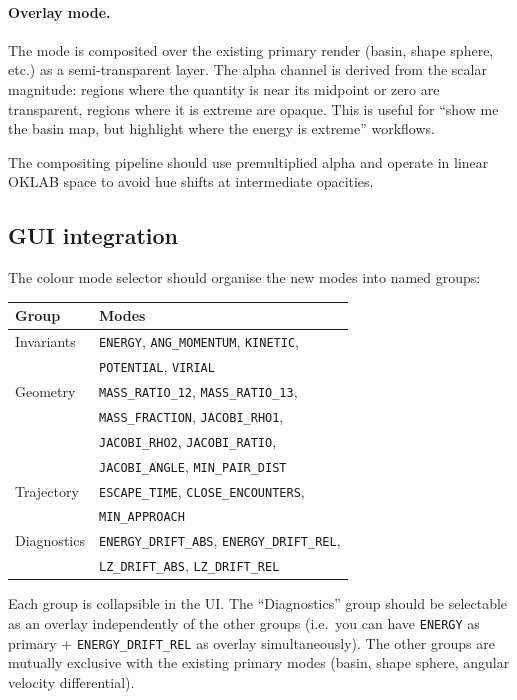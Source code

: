 \documentclass[11pt]{article}
\begin{document}
\paragraph{Overlay mode.} The mode is composited over the existing primary
render (basin, shape sphere, etc.) as a semi-transparent layer. The alpha
channel is derived from the scalar magnitude: regions where the quantity is
near its midpoint or zero are transparent, regions where it is extreme are
opaque. This is useful for ``show me the basin map, but highlight where the
energy is extreme'' workflows.

The compositing pipeline should use premultiplied alpha and operate in linear
OKLAB space to avoid hue shifts at intermediate opacities.

\subsection{GUI integration}

The colour mode selector should organise the new modes into named groups:

\begin{center}
\begin{tabular}{ll}
\toprule
Group & Modes \\
\midrule
Invariants & \texttt{ENERGY}, \texttt{ANG\_MOMENTUM}, \texttt{KINETIC}, \\
 & \texttt{POTENTIAL}, \texttt{VIRIAL} \\
Geometry & \texttt{MASS\_RATIO\_12}, \texttt{MASS\_RATIO\_13}, \\
 & \texttt{MASS\_FRACTION}, \texttt{JACOBI\_RHO1}, \\
 & \texttt{JACOBI\_RHO2}, \texttt{JACOBI\_RATIO}, \\
 & \texttt{JACOBI\_ANGLE}, \texttt{MIN\_PAIR\_DIST} \\
Trajectory & \texttt{ESCAPE\_TIME}, \texttt{CLOSE\_ENCOUNTERS}, \\
 & \texttt{MIN\_APPROACH} \\
Diagnostics & \texttt{ENERGY\_DRIFT\_ABS}, \texttt{ENERGY\_DRIFT\_REL}, \\
 & \texttt{LZ\_DRIFT\_ABS}, \texttt{LZ\_DRIFT\_REL} \\
\bottomrule
\end{tabular}
\end{center}

Each group is collapsible in the UI. The ``Diagnostics'' group should be
selectable as an overlay independently of the other groups (i.e.\ you can have
\texttt{ENERGY} as primary + \texttt{ENERGY\_DRIFT\_REL} as overlay
simultaneously). The other groups are mutually exclusive with the existing
primary modes (basin, shape sphere, angular velocity differential).
\end{document}
